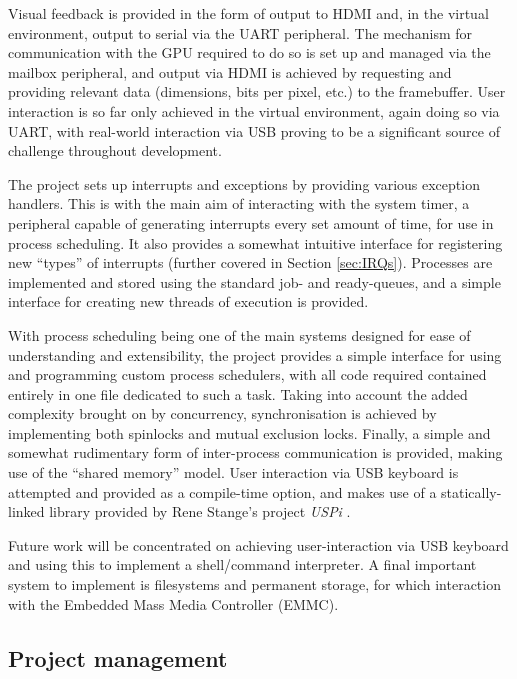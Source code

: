    Visual feedback is provided in the form of output to HDMI and, in the
    virtual environment, output to serial via the UART peripheral.  The
    mechanism for communication with the GPU required to do so is set up and
    managed via the mailbox peripheral, and output via HDMI is achieved by
    requesting and providing relevant data (dimensions, bits per pixel, etc.) to
    the framebuffer. User interaction is so far only achieved in the virtual
    environment, again doing so via UART, with real-world interaction via USB
    proving to be a significant source of challenge throughout development.

    The project sets up interrupts and exceptions by providing various exception
    handlers. This is with the main aim of interacting with the system timer, a
    peripheral capable of generating interrupts every set amount of time, for
    use in process scheduling. It also provides a somewhat intuitive interface
    for registering new ``types'' of interrupts (further covered in Section
    \ref{sec:IRQs}). Processes are implemented and stored using the standard
    job- and ready-queues, and a simple interface for creating new threads of
    execution is provided.

    With process scheduling being one of the main systems designed for ease of
    understanding and extensibility, the project provides a simple interface for
    using and programming custom process schedulers, with all code required
    contained entirely in one file dedicated to such a task.  Taking into
    account the added complexity brought on by concurrency, synchronisation is
    achieved by implementing both spinlocks and mutual exclusion locks.
    Finally, a simple and somewhat rudimentary form of inter-process
    communication is provided, making use of the ``shared memory'' model. User
    interaction via USB keyboard is attempted and provided as a compile-time
    option, and makes use of a statically-linked library provided by Rene
    Stange's project \textit{USPi} \cite{USPi}.

    Future work will be concentrated on achieving user-interaction via USB
    keyboard and using this to implement a shell/command interpreter. A final
    important system to implement is filesystems and permanent storage, for
    which interaction with the Embedded Mass Media Controller (EMMC).

\subsection{Project management}
